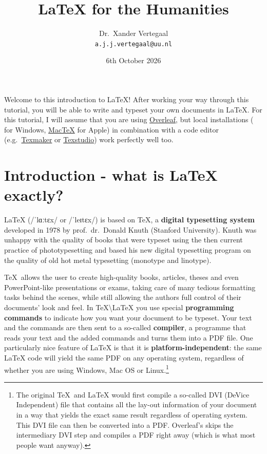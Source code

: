 \documentclass{article}
\title{\LaTeX{} for the Humanities}
\author{Dr.\ Xander Vertegaal\\\texttt{a.j.j.vertegaal@uu.nl}}
\date{6th October 2026}
\newcommand{\ipa}[1]{{\charissil #1}}
\newcommand{\definition}[1]{\textbf{#1}}
\begin{document}
\maketitle

Welcome to this introduction to \LaTeX! After working your way through this tutorial, you will be able to write and typeset your own documents in \LaTeX. For this tutorial, I will assume that you are using \href{www.overleaf.com}{Overleaf}, but local installations (\href{https://miktex.org/}{} for Windows, \href{http://www.tug.org/mactex/}{Mac\TeX{}} for Apple) in combination with a code editor (e.g.\ \href{https://www.xm1math.net/texmaker/}{Texmaker} or \href{https://www.texstudio.org/}{Texstudio}) work perfectly well too.

\section{Introduction - what is \LaTeX{} exactly?}\label{secintro}

\LaTeX{} (\ipa{/ˈlɑːtɛx/ or /ˈleɪtɛx/}) is based on \TeX, a \definition{digital typesetting system} developed in 1978 by prof.~dr.~Donald Knuth (Stanford University). Knuth was unhappy with the quality of books that were typeset using the then current practice of phototypesetting and based his new digital typesetting program on the quality of old hot metal typesetting (monotype and linotype).

\TeX\ allows the user to create high-quality books, articles, theses and even PowerPoint-like presentations or exams, taking care of many tedious formatting tasks behind the scenes, while still allowing the authors full control of their documents' look and feel. In \TeX\textbackslash\LaTeX{} you use special \definition{programming commands} to indicate how you want your document to be typeset. Your text and the commands are then sent to a so-called \definition{compiler}, a programme that reads your text and the added commands and turns them into a PDF file. One particularly nice feature of \LaTeX{} is that it is \definition{platform-independent}: the same \LaTeX{} code will yield the same PDF on any operating system, regardless of whether you are using Windows, Mac OS or Linux.\footnote{The original \TeX\ and \LaTeX{} would first compile a so-called DVI (DeVice Independent) file that contains all the lay-out information of your document in a way that yields the exact same result regardless of operating system. This DVI file can then be converted into a PDF. Overleaf's  skips the intermediary DVI step and compiles a PDF right away (which is what most people want anyway).}
\end{document}
